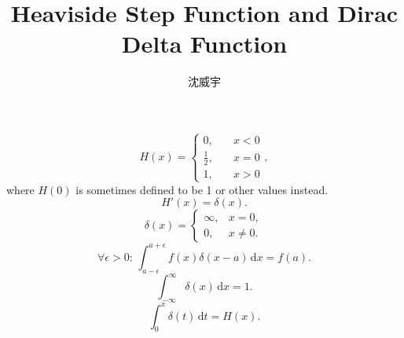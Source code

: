 \documentclass[a4paper,12pt]{article}
\begin{document}
\title{Heaviside Step Function and Dirac Delta Function}
\author{沈威宇}
\date{\temtoday}
\titletocdoc
{}
\[H(x)=\begin{cases}0,\quad &x<0\\\frac{1}{2},\quad &x=0\\1,\quad &x>0\end{cases},\]
where $H(0)$ is sometimes defined to be 1 or other values instead.
\[H'(x)=\delta(x).\]
\[
\delta(x) =
\begin{cases}
\infty, & x = 0, \\
0, & x \neq 0.
\end{cases}
\]
\[
\forall \epsilon > 0:\,\int_{a-\epsilon}^{a+\epsilon} f(x) \delta(x-a) \, \mathrm{d}x = f(a).
\]
\[
\int _{-\infty }^{\infty }\delta(x) \, \mathrm{d}x = 1.
\]
\[\int_0^x\delta(t)\,\mathrm{d}t=H(x).\]
\end{document}
